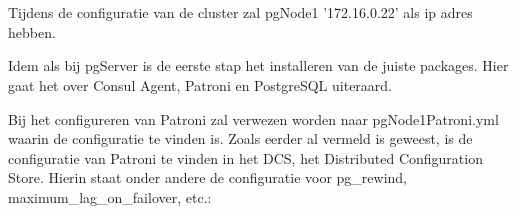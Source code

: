 \section{}
\label{sec:pgNode1}
Tijdens de configuratie van de cluster zal pgNode1 '172.16.0.22' als ip adres hebben.


Idem als bij pgServer is de eerste stap het installeren van de juiste packages. Hier gaat het over Consul Agent, Patroni en PostgreSQL uiteraard.

Bij het configureren van Patroni zal verwezen worden naar pgNode1Patroni.yml waarin de configuratie te vinden is. Zoals eerder al vermeld is geweest, is de configuratie van Patroni te vinden in het DCS, het Distributed Configuration Store. Hierin staat onder andere de configuratie voor pg\_rewind, maximum\_lag\_on\_failover, etc.:

